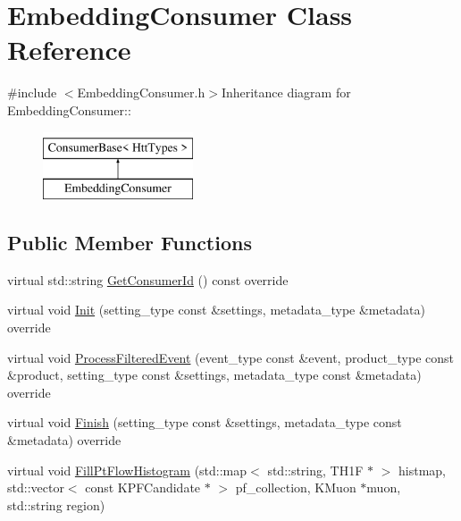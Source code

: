 \hypertarget{classEmbeddingConsumer}{
\section{EmbeddingConsumer Class Reference}
\label{classEmbeddingConsumer}
}


{\ttfamily \#include $<$EmbeddingConsumer.h$>$}Inheritance diagram for EmbeddingConsumer::\begin{figure}[H]
\begin{center}
\leavevmode
\includegraphics[height=2cm]{classEmbeddingConsumer}
\end{center}
\end{figure}
\subsection*{Public Member Functions}
\begin{DoxyCompactItemize}
\item 
virtual std::string \hyperlink{classEmbeddingConsumer_aeac6c210fd46bd9bb1f56c496ca0ff50}{GetConsumerId} () const override
\item 
virtual void \hyperlink{classEmbeddingConsumer_a47494820d0e08242f08c6b8afa7c347f}{Init} (setting\_\-type const \&settings, metadata\_\-type \&metadata) override
\item 
virtual void \hyperlink{classEmbeddingConsumer_afb8e7cec39d5722d4cd30e56e8cae6fc}{ProcessFilteredEvent} (event\_\-type const \&event, product\_\-type const \&product, setting\_\-type const \&settings, metadata\_\-type const \&metadata) override
\item 
virtual void \hyperlink{classEmbeddingConsumer_aab5d24f15ec4efe3186d72a1fa0b1fa7}{Finish} (setting\_\-type const \&settings, metadata\_\-type const \&metadata) override
\item 
virtual void \hyperlink{classEmbeddingConsumer_adeac700fdc0f9fc8bc3c19c5a2220158}{FillPtFlowHistogram} (std::map$<$ std::string, TH1F $\ast$ $>$ histmap, std::vector$<$ const KPFCandidate $\ast$ $>$ pf\_\-collection, KMuon $\ast$muon, std::string region)
\end{DoxyCompactItemize}


